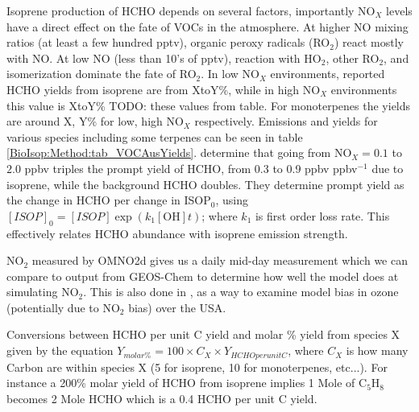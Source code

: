     
    Isoprene production of HCHO depends on several factors, importantly NO$_X$ levels have a direct effect on the fate of VOCs in the atmosphere.
    At higher NO mixing ratios (at least a few hundred pptv), organic peroxy radicals (RO$_2$) react mostly with NO. 
    At low NO (less than 10's of pptv), reaction with HO$_2$, other RO$_2$, and isomerization dominate the fate of RO$_2$.
    In low NO$_X$ environments, reported HCHO yields from isoprene are from XtoY\%, while in high NO$_X$ environments this value is XtoY\% TODO: these values from table.
    For monoterpenes the yields are around X, Y\% for low, high NO$_X$ respectively.
    Emissions and yields for various species including some terpenes can be seen in table \ref{BioIsop:Method:tab_VOCAusYields}.
    \textcite{Wolfe2016} determine that going from NO$_X = 0.1$ to $2.0$ ppbv triples the prompt yield of HCHO, from 0.3 to 0.9 ppbv ppbv$^{-1}$ due to isoprene, while the background HCHO doubles.
    They determine prompt yield as the change in HCHO per change in ISOP$_0$, using $[ISOP]_0=[ISOP]\exp(k_1[\mathrm{OH}]t)$; where $k_1$ is first order loss rate.
    This effectively relates HCHO abundance with isoprene emission strength.
    
    NO$_2$ measured by OMNO2d gives us a daily mid-day measurement which we can compare to output from GEOS-Chem to determine how well the model does at simulating NO$_2$.
    This is also done in \textcite{Travis2016}, as a way to examine model bias in ozone (potentially due to NO$_2$ bias) over the USA.
    
    Conversions between HCHO per unit C yield and molar \% yield from species X given by the equation $ Y_{molar \%} = 100 \times C_X \times Y_{HCHO per unit C} $, where $C_X$ is how many Carbon are within species X (5 for isoprene, 10 for monoterpenes, etc...).
    For instance a 200\% molar yield of HCHO from isoprene implies 1 Mole of C$_5$H$_8$ becomes 2 Mole HCHO which is a 0.4 HCHO per unit C yield.
    

